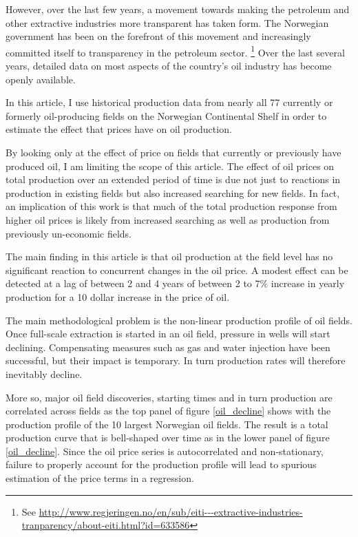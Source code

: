 \documentclass[12pt]{article}
\begin{document}
However, over the last few years, a movement towards making the petroleum and other extractive industries more transparent has taken form.  The Norwegian government has been on the forefront of this movement and increasingly committed itself to transparency in the petroleum sector. \footnote{See \url{http://www.regjeringen.no/en/sub/eiti---extractive-industries-tranparency/about-eiti.html?id=633586}} Over the last several years, detailed data on most aspects of the country's oil industry has become openly available.  

In this article, I use historical production data from nearly all 77 currently or formerly oil-producing fields on the Norwegian Continental Shelf in order to estimate the effect that prices have on oil production. 

By looking only at the effect of price on fields that currently or previously have produced oil, I am limiting the scope of this article.  The effect of oil prices on total production over an extended period of time is due not just to reactions in production in existing fields but also increased searching for new fields.  In fact, an implication of this work is that much of the total production response from higher oil prices is likely from increased searching as well as production from previously un-economic fields.

The main finding in this article is that oil production at the field level has no significant reaction to concurrent changes in the oil price.  A modest effect can be detected at a lag of between 2 and 4 years of between 2 to 7\% increase in yearly production for a 10 dollar increase in the price of oil.


The main methodological problem is the non-linear production profile of oil fields.  Once full-scale extraction is started in an oil field, pressure in wells will start declining. Compensating measures such as gas and water injection have been successful, but their impact is temporary. In turn production rates will therefore inevitably decline.

More so, major oil field discoveries, starting times and in turn production are correlated across fields as the top panel of figure \ref{oil_decline} shows with the production profile of the 10 largest Norwegian oil fields.  The result is a total production curve that is bell-shaped over time as in the lower panel of figure \ref{oil_decline}.  Since the oil price series is autocorrelated and non-stationary, failure to properly account for the production profile will lead to spurious estimation of the price terms in a regression.
\end{document}
